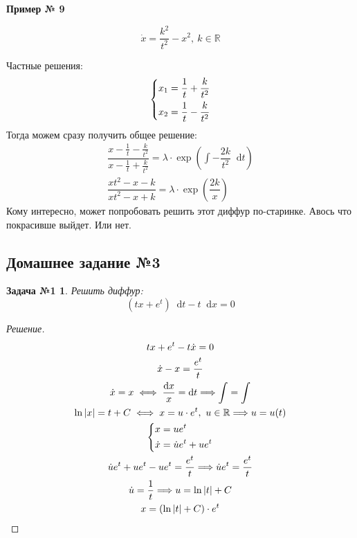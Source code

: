 \documentclass[a4paper,12pt]{article}
\newtheorem*{task1}{Задача №1}
\newcommand{\R}{\mathbb{R}}
\renewcommand*\d{\mathop{}\!\mathrm{d}}
\newcommand{\du}{\dot{u}}
\newcommand{\dx}{\dot{x}}
\newcommand{\ds}{\displaystyle}
\begin{document}
\textbf{Пример № 9}

\[\dx = \dfrac{k^2}{t^2} - x^2,\ k \in \R\]

Частные решения:
\[\left\{\begin{gathered}
x_1 = \dfrac{1}{t} + \dfrac{k}{t^2}\hfill\\
x_2 = \dfrac{1}{t} - \dfrac{k}{t^2}\hfill
\end{gathered}\right.\]
Тогда можем сразу получить общее решение:
\begin{gather*}
\dfrac{x - \frac{1}{t} - \frac{k}{t^2}}{x - \frac{1}{t} + \frac{k}{t^2}} = \lambda \cdot \exp(\ds\int -\dfrac{2k}{t^2}\d t)\\
\dfrac{xt^2 - x - k}{xt^2 - x + k} = \lambda \cdot \exp(\dfrac{2k}{x})
\end{gather*}
Кому интересно, может попробовать решить этот диффур по-старинке. Авось что покрасивше выйдет. Или нет.

\subsection{Домашнее задание №3}

\begin{task1}
Решить диффур:
\[(tx + e^t)\d t - t\d x = 0\]
\end{task1}
\begin{proof}[Решение]
	\begin{gather*}
		tx + e^t - t\dx = 0\\
		\dx - x = \dfrac{e^t}{t}\\
		\dx = x \iff \dfrac{\d x}{x} = \d t \Longrightarrow \ds\int = \int\\
		\ln|x| = t + C \iff x = u \cdot e^t,\ u \in \R \Longrightarrow u = u(t)\\
		\left\{\begin{gathered}
		x = ue^t\hfill\\
		\dx = \du e^t + ue^t\hfill
		\end{gathered}\right.\\
		\du e^t + ue^t - ue^t = \dfrac{e^t}{t} \Longrightarrow \du e^t = \dfrac{e^t}{t}\\
		\du = \dfrac{1}{t} \Longrightarrow u = \ln|t| + C\\
		x = (\ln|t| + C) \cdot e^t
	\end{gather*}
\end{proof}
\end{document}
